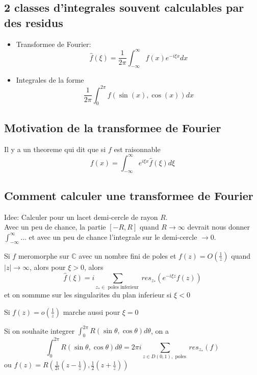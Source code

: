 \documentclass[../main.tex]{subfiles}
\begin{document}
\subsection{2 classes d'integrales souvent calculables par des residus}
\begin{itemize}
\item Transformee de Fourier:
	\[ 
	\hat{f}( \xi) = \frac{1}{2\pi}\int_{ - \infty  }^{ \infty  } f( x) e^{ -i \xi x} dx
	\]

\item Integrales de la forme
	\[ 
	\frac{1}{2\pi}\int_{ 0 }^{ 2\pi }f( \sin( x) , \cos( x) ) dx
	\]
	
	
\end{itemize}
\subsection*{Motivation de la transformee de Fourier}
Il y a un theoreme qui dit que si $f$ est raisonnable
\[ 
f( x) = \int_{ - \infty  }^{ \infty  } e^{i\xi x} \hat{f}( \xi) d\xi
\]
\subsection*{Comment calculer une transformee de Fourier}
Idee: Calculer pour un lacet demi-cercle de rayon $R$.\\
Avec un peu de chance, la partie $ [ -R, R] $ quand $R\to \infty $ devrait nous donner $ \int_{ - \infty  }^{ \infty  }\ldots$ et avec un peu de chance l'integrale sur le demi-cercle $\to 0$.
\begin{propo}
Si $f$ meromorphe sur $\mathbb{C}$ avec un nombre fini de poles et $f( z) = O( \frac{1}{z}) $ quand $|z|\to \infty $, alors pour $\xi>0	$, alors
\[ 
\hat{f}( \xi) =i \sum_{ z_* \in \text{ poles inferieur } }^{ }	res_{z_*} ( e^{- i \xi z} f( z) )
\]
et on sommme sur les singularites du plan inferieur si $\xi <0$ 

\end{propo}
\begin{rmq}
Si $f( z) = o( \frac{1}{z}) $ marche aussi pour $\xi = 0$ 
\end{rmq}
\begin{propo}
Si on souhaite integrer $ \int_{ 0 }^{ 2\pi } R( \sin\theta,\cos\theta) d\theta $, on a
\[ 
\int_{ 0 }^{ 2\pi } R( \sin\theta,\cos\theta) d\theta  = 2\pi i \sum_{z\in D( 0,1), \text{ poles }  } res_{z_*} ( f)
\]
ou $f( z) = R( \frac{1}{2i}( z-\frac{1}{z}) , \frac{1}{2}( z+\frac{1}{z}) ) $ 

\end{propo}
\end{document}
